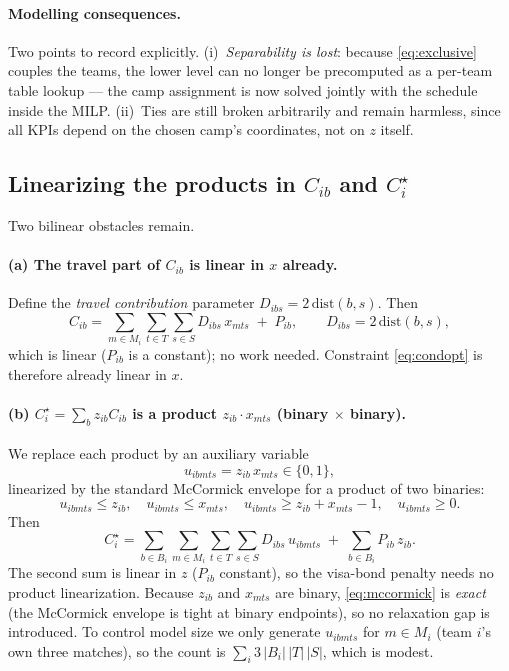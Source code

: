 \documentclass[12pt, letterpaper]{article}
\begin{document}
\paragraph{Modelling consequences.} Two points to record explicitly.
(i)~\emph{Separability is lost}: because \eqref{eq:exclusive} couples the
teams, the lower level can no longer be precomputed as a per-team table
lookup --- the camp assignment is now solved jointly with the schedule
inside the MILP. (ii)~Ties are still broken arbitrarily and remain
harmless, since all KPIs depend on the chosen camp's coordinates, not on
$z$ itself.

\subsection{Linearizing the products in $C_{ib}$ and $C_i^\star$}
\label{sec:bilinear}

Two bilinear obstacles remain.

\paragraph{(a) The travel part of $C_{ib}$ is linear in $x$ already.}
Define the \emph{travel contribution} parameter
$D_{ibs}=2\,\mathrm{dist}(b,s)$. Then
\begin{equation}
C_{ib}=\sum_{m\in M_i}\sum_{t\in T}\sum_{s\in S} D_{ibs}\,x_{mts}
       \;+\; P_{ib},
\qquad D_{ibs}=2\,\mathrm{dist}(b,s),
\end{equation}
which is linear ($P_{ib}$ is a constant); no work needed. Constraint
\eqref{eq:condopt} is therefore already linear in $x$.

\paragraph{(b) $C_i^\star=\sum_b z_{ib}C_{ib}$ is a product
$z_{ib}\cdot x_{mts}$ (binary $\times$ binary).} We replace each product
by an auxiliary variable
\begin{equation}
u_{ibmts}=z_{ib}\,x_{mts}\in\{0,1\},
\end{equation}
linearized by the standard McCormick envelope for a product of two
binaries:
\begin{equation}
u_{ibmts}\le z_{ib},\quad
u_{ibmts}\le x_{mts},\quad
u_{ibmts}\ge z_{ib}+x_{mts}-1,\quad
u_{ibmts}\ge 0.
\label{eq:mccormick}
\end{equation}
Then
\begin{equation}
C_i^\star=\sum_{b\in B_i}\sum_{m\in M_i}\sum_{t\in T}\sum_{s\in S}
   D_{ibs}\,u_{ibmts}
   \;+\;\sum_{b\in B_i} P_{ib}\,z_{ib}.
\end{equation}
The second sum is linear in $z$ ($P_{ib}$ constant), so the visa-bond
penalty needs no product linearization.
Because $z_{ib}$ and $x_{mts}$ are binary, \eqref{eq:mccormick} is
\emph{exact} (the McCormick envelope is tight at binary endpoints), so no
relaxation gap is introduced. To control model size we only generate
$u_{ibmts}$ for $m\in M_i$ (team $i$'s own three matches), so the count is
$\sum_i 3\,|B_i|\,|T|\,|S|$, which is modest.
\end{document}
